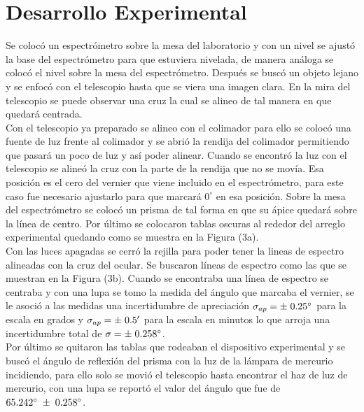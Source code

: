 \documentclass[DIV=calc, paper=a4, fontsize=11pt]{scrartcl}
\begin{document}
\section*{\textcolor{carmine}{Desarrollo Experimental}}
Se colocó un espectrómetro sobre la mesa del laboratorio y con un nivel se ajustó la base del espectrómetro para que estuviera nivelada, de manera análoga se colocó el nivel sobre la mesa del espectrómetro. Después se  buscó un objeto lejano y se enfocó con el telescopio hasta que se viera una imagen clara. En la mira del telescopio se puede observar una cruz la cual se alineo de tal manera en que quedará centrada.\\ Con el telescopio ya preparado se alineo con el colimador para ello se colocó una fuente de luz frente al colimador y se abrió la rendija del colimador permitiendo que pasará un poco de luz y así poder alinear. Cuando se encontró la luz con el telescopio se alineó la cruz con la parte de la rendija que no se movía. Esa posición es el cero del vernier que viene incluido en el espectrómetro, para este caso fue necesario ajustarlo para que marcará $0^{\circ}$ en esa posición. Sobre la mesa del espectrómetro se colocó un prisma de tal forma en que su ápice quedará sobre la línea de centro. Por último se colocaron tablas oscuras al rededor del arreglo experimental quedando como se muestra en la Figura (3a). \\ Con las luces apagadas se cerró la rejilla para poder tener la lineas de espectro alineadas con la cruz del ocular. Se buscaron líneas de espectro como las que se muestran en la Figura (3b). Cuando se encontraba una línea de espectro se centraba y con una lupa se tomo la medida del ángulo que marcaba el vernier, se le asoció a las medidas una incertidumbre de apreciación $\sigma_{ap}=\pm \hspace{0.1cm} 0.25^{\circ}$  para la escala en grados y $\sigma_{ap}=\pm \hspace{0.1cm} 0.5'$ para la escala en minutos lo que arroja una incertidumbre total de $\sigma=\pm\hspace{0.1cm}0.258^{\circ}$.\\ Por último se quitaron las tablas que rodeaban el dispositivo experimental y se buscó el ángulo de reflexión del prisma con la luz de la lámpara de mercurio incidiendo, para ello solo se movió el telescopio hasta encontrar el haz de luz de mercurio, con una lupa se  reportó el valor del ángulo que fue de $65.242^{\circ}\hspace{0.1cm}\pm\hspace{0.1cm}0.258^{\circ}$.
\end{document}
